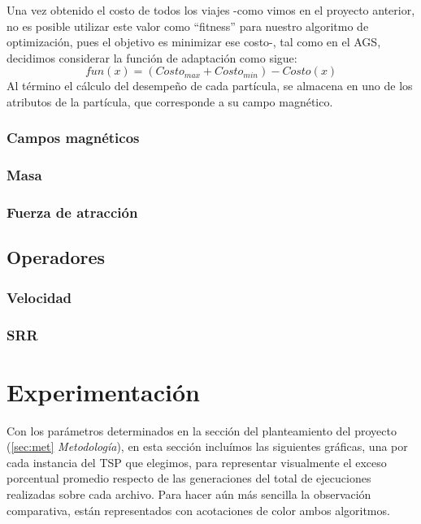 \documentclass[12pt]{article}
\begin{document}
Una vez obtenido el costo de todos los viajes -como vimos en el proyecto
anterior, no es posible utilizar este valor como ``fitness'' para nuestro algoritmo de optimización, pues el objetivo es minimizar ese costo-,
tal como en el AGS, decidimos considerar la función de
adaptación como sigue:
\begin{equation}
  fun(x) = (Costo_{max} + Costo_{min})-Costo(x)
\end{equation}
Al término el cálculo del desempeño de cada partícula, se almacena en uno de los atributos de la partícula, que corresponde a su campo magnético.

\subsubsection*{Campos magnéticos}
\subsubsection*{Masa}
\subsubsection*{Fuerza de atracción}

\subsection*{Operadores}
\subsubsection*{Velocidad}\label{sec:vel}

\subsubsection*{SRR}
\newpage
\section{Experimentación}
Con los parámetros determinados en la sección del planteamiento del
proyecto (\ref{sec:met} \textit{Metodología}), en esta sección incluímos las siguientes gráficas, una por cada instancia del TSP que elegimos, para representar visualmente el exceso porcentual promedio respecto de las generaciones del total de ejecuciones realizadas sobre cada archivo.
Para hacer aún más sencilla la observación comparativa, están representados con acotaciones de color ambos algoritmos.
\end{document}
